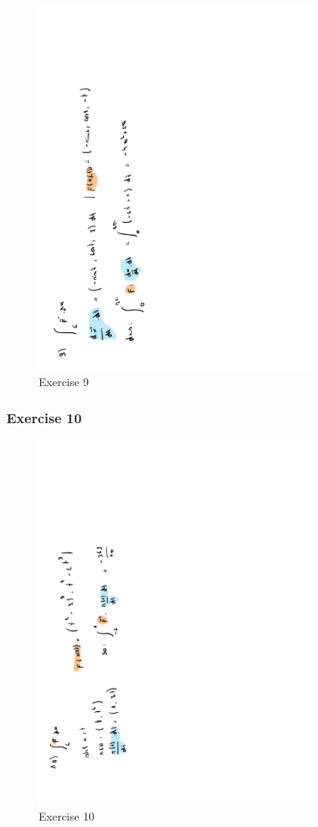 \documentclass[a4paper]{report}
\begin{document}
\begin{figure}[H]
	\centering
	\includegraphics[angle=-90, width=0.8\textwidth]{assets/huis_6_ex_9.pdf}
	\caption{Exercise 9}
	\label{fig:huis_6_ex_9}
\end{figure}

\subsubsection{Exercise 10}

\begin{figure}[H]
	\centering
	\includegraphics[angle=-90, width=0.8\textwidth]{assets/huis_6_ex_10.pdf}
	\caption{Exercise 10}
	\label{fig:huis_6_ex_10}
\end{figure}
\end{document}
